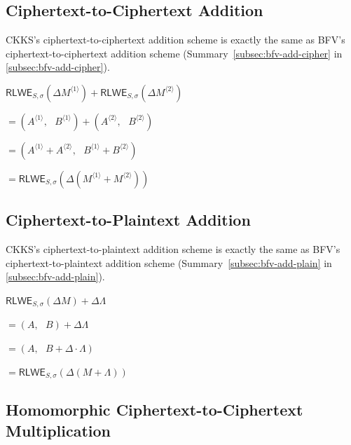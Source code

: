 \subsection{Ciphertext-to-Ciphertext Addition}
\label{subsec:ckks-add-cipher}

CKKS's ciphertext-to-ciphertext addition scheme is exactly the same as BFV's ciphertext-to-ciphertext addition scheme (Summary~\ref*{subsec:bfv-add-cipher} in \autoref{subsec:bfv-add-cipher}). 




\begin{tcolorbox}[title={\textbf{\tboxlabel{\ref*{subsec:ckks-add-cipher}} CKKS Ciphertext-to-Ciphertext Addition}}]
$\textsf{RLWE}_{S, \sigma}(\Delta M^{\langle 1 \rangle} ) + \textsf{RLWE}_{S, \sigma}(\Delta M^{\langle 2 \rangle} ) $

$ = ( A^{\langle 1 \rangle}, \text{ } B^{\langle 1 \rangle}) + (A^{\langle 2 \rangle}, \text{ } B^{\langle 2 \rangle}) $

$ = ( A^{\langle 1 \rangle} + A^{\langle 2 \rangle}, \text{ } B^{\langle 1 \rangle} + B^{\langle 2 \rangle} ) $

$= \textsf{RLWE}_{S, \sigma}(\Delta(M^{\langle 1 \rangle} + M^{\langle 2 \rangle}) )$
\end{tcolorbox}


\subsection{Ciphertext-to-Plaintext Addition}
\label{subsec:ckks-add-plain}

CKKS's ciphertext-to-plaintext addition scheme is exactly the same as BFV's ciphertext-to-plaintext addition scheme (Summary~\ref*{subsec:bfv-add-plain} in \autoref{subsec:bfv-add-plain}). 



\begin{tcolorbox}[title={\textbf{\tboxlabel{\ref*{subsec:ckks-add-plain}} CKKS Ciphertext-to-Plaintext Addition}}]
$\textsf{RLWE}_{S, \sigma}(\Delta M) + \Delta\Lambda $

$=  (A, \text{ } B) + \Delta\Lambda$

$=  (A, \text{ } B + \Delta\cdot\Lambda)$

$= \textsf{RLWE}_{S, \sigma}(\Delta (M + \Lambda) )$
\end{tcolorbox}




\subsection{Homomorphic Ciphertext-to-Ciphertext Multiplication}
\label{subsec:ckks-mult-cipher}

